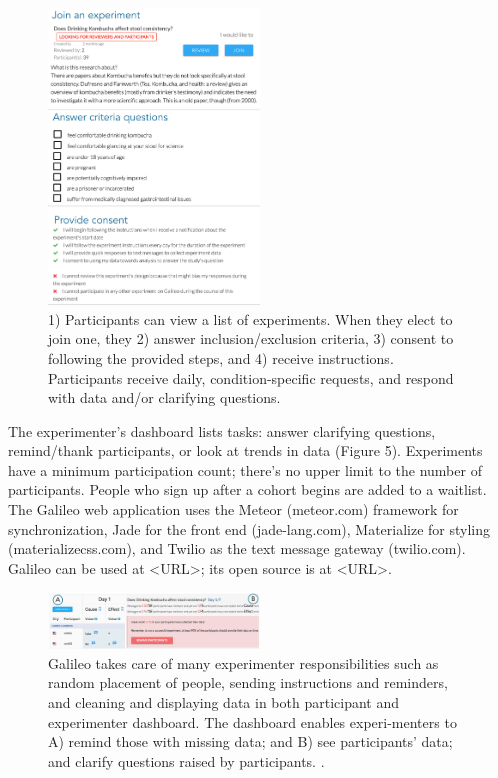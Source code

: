 \begin{figure}[h] 
  \centering
  \includegraphics[width=0.5\textwidth]{figures/galileo/galileo-2-run}
  \caption[]
{1) Participants can view a list of experiments. When they elect to join one, they 2) answer inclusion/exclusion criteria, 3) consent to following the provided steps, and 4) receive instructions. Participants receive daily, condition-specific requests, and respond with data and/or clarifying questions. }
  \label{fig:galileo-2-run}
\end{figure}

The experimenter’s dashboard lists tasks: answer clarifying questions, remind/thank participants, or look at trends in data (Figure 5). Experiments have a minimum participation count; there’s no upper limit to the number of participants. People who sign up after a cohort begins are added to a waitlist.
The Galileo web application uses the Meteor (meteor.com) framework for synchronization, Jade for the front end (jade-lang.com), Materialize for styling (materializecss.com), and Twilio as the text message gateway (twilio.com). Galileo can be used at <URL>; its open source is at <URL>. 

\begin{figure}[h] 
  \centering
  \includegraphics[width=0.5\textwidth]{figures/galileo/galileo-2-run-1}
  \caption[]
{Galileo takes care of many experimenter responsibilities such as random placement of people, sending instructions and reminders, and cleaning and displaying data in both participant and experimenter dashboard. The dashboard enables experi-menters to A) remind those with missing data; and B) see participants’ data; and clarify questions raised by participants. . }
  \label{fig:galileo-2-run-1}
\end{figure}
 

